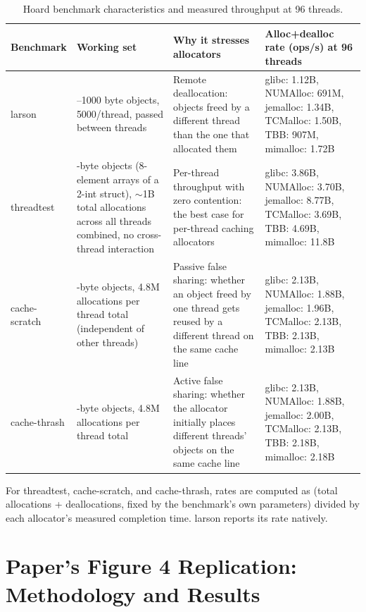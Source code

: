 \documentclass[11pt,a4paper]{article}
\begin{document}
\begin{table}[htbp]
\centering
\small
\renewcommand{\arraystretch}{1.25}
\begin{tabularx}{\textwidth}{@{}p{1.7cm} >{\raggedright\arraybackslash}p{3.7cm} >{\raggedright\arraybackslash}p{3.4cm} >{\raggedright\arraybackslash}X@{}}
\toprule
\textbf{Benchmark} & \textbf{Working set} & \textbf{Why it stresses allocators} & \textbf{Alloc+dealloc rate (ops/s) at 96 threads} \\
\midrule
larson &
8--1000 byte objects, 5000/thread, passed between threads &
Remote deallocation: objects freed by a different thread than the one that allocated them &
glibc: 1.12B, NUMAlloc: 691M, jemalloc: 1.34B, TCMalloc: 1.50B, TBB: 907M, mimalloc: 1.72B \\
\addlinespace
threadtest &
64-byte objects (8-element arrays of a 2-int struct), $\sim$1B total allocations across all threads combined, no cross-thread interaction &
Per-thread throughput with zero contention: the best case for per-thread caching allocators &
glibc: 3.86B, NUMAlloc: 3.70B, jemalloc: 8.77B, TCMalloc: 3.69B, TBB: 4.69B, mimalloc: 11.8B \\
\addlinespace
cache-scratch &
8-byte objects, 4.8M allocations per thread total (independent of other threads) &
Passive false sharing: whether an object freed by one thread gets reused by a different thread on the same cache line &
glibc: 2.13B, NUMAlloc: 1.88B, jemalloc: 1.96B, TCMalloc: 2.13B, TBB: 2.13B, mimalloc: 2.13B \\
\addlinespace
cache-thrash &
8-byte objects, 4.8M allocations per thread total &
Active false sharing: whether the allocator initially places different threads' objects on the same cache line &
glibc: 2.13B, NUMAlloc: 1.88B, jemalloc: 2.00B, TCMalloc: 2.13B, TBB: 2.18B, mimalloc: 2.18B \\
\bottomrule
\end{tabularx}
\caption{Hoard benchmark characteristics and measured throughput at 96 threads.}
\end{table}

For threadtest, cache-scratch, and cache-thrash, rates are computed as (total allocations + deallocations, fixed by the benchmark's own parameters) divided by each allocator's measured completion time. larson reports its rate natively.

\section{Paper's Figure 4 Replication: Methodology and Results}
\end{document}
